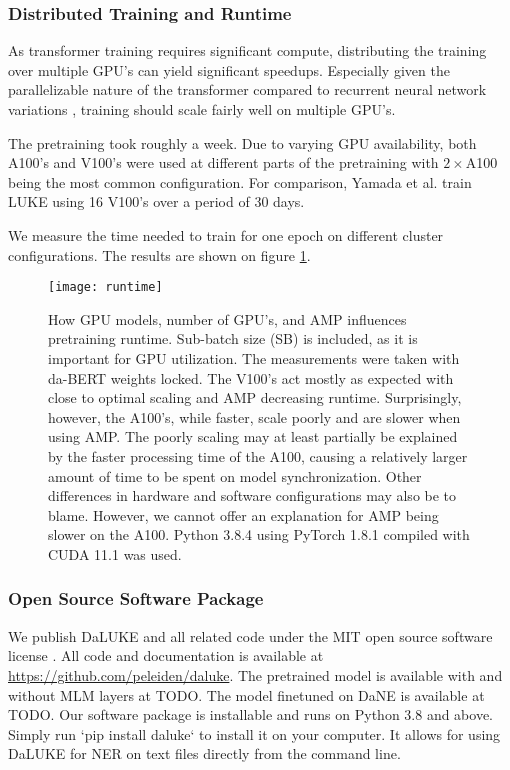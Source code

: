 \documentclass[main.tex]{subfiles}
\begin{document}
\subsubsection{Distributed Training and Runtime}
As transformer training requires significant compute, distributing the training over multiple GPU's can yield significant speedups.
Especially given the parallelizable nature of the transformer compared to recurrent neural network variations \cite{vaswani2017att}, training should scale fairly well on multiple GPU's.

The pretraining took roughly a week.
Due to varying GPU availability, both A100's and V100's were used at different parts of the pretraining with $ 2\times $A100 being the most common configuration.
For comparison, Yamada et al. train LUKE using 16 V100's over a period of 30 days. \cite{yamada2020luke}

We measure the time needed to train for one epoch on different cluster configurations.
The results are shown on figure \ref{fig:runtime}.
\begin{figure}[H]
    \centering
    \texttt{[image: runtime]}
    \caption{
        How GPU models, number of GPU's, and AMP influences pretraining runtime.
        Sub-batch size (SB) is included, as it is important for GPU utilization.
        The measurements were taken with da-BERT weights locked.
        The V100's act mostly as expected with close to optimal scaling and AMP decreasing runtime.
        Surprisingly, however, the A100's, while faster, scale poorly and are slower when using AMP.
        The poorly scaling may at least partially be explained by the faster processing time of the A100, causing a relatively larger amount of time to be spent on model synchronization.
        Other differences in hardware and software configurations may also be to blame.
        However, we cannot offer an explanation for AMP being slower on the A100.
        Python 3.8.4 using PyTorch 1.8.1 compiled with CUDA 11.1 was used.
    }
    \label{fig:runtime}
\end{figure}\noindent

\subsubsection{Open Source Software Package}
We publish DaLUKE and all related code under the MIT open source software license \cite{mitlicense}.
All code and documentation is available at \url{https://github.com/peleiden/daluke}.
The pretrained model is available with and without MLM layers at TODO.
The model finetuned on DaNE is available at TODO.
Our software package is  installable and runs on Python 3.8 and above.
Simply run `pip install daluke` to install it on your computer.
It allows for using DaLUKE for NER on text files directly from the command line.
\end{document}
